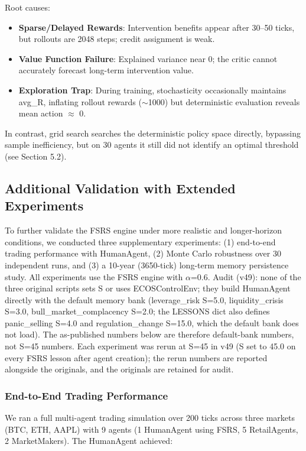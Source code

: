 \documentclass[11pt]{article}
\begin{document}
Root causes:

\begin{itemize}
\item \textbf{Sparse/Delayed Rewards}: Intervention benefits appear after 30--50 ticks, but rollouts are 2048 steps; credit assignment is weak.
\item \textbf{Value Function Failure}: Explained variance near 0; the critic cannot accurately forecast long-term intervention value.
\item \textbf{Exploration Trap}: During training, stochasticity occasionally maintains avg\_R, inflating rollout rewards ($\sim$1000) but deterministic evaluation reveals mean action $\approx$ 0.
\end{itemize}

In contrast, grid search searches the deterministic policy space directly, bypassing sample inefficiency, but on 30 agents it still did not identify an optimal threshold (see Section 5.2).

\subsection{Additional Validation with Extended Experiments}
To further validate the FSRS engine under more realistic and longer-horizon conditions, we conducted three supplementary experiments: (1) end-to-end trading performance with HumanAgent, (2) Monte Carlo robustness over 30 independent runs, and (3) a 10-year (3650-tick) long-term memory persistence study. All experiments use the FSRS engine with $\alpha$=0.6. Audit (v49): none of the three original scripts sets S or uses ECOSControlEnv; they build HumanAgent directly with the default memory bank (leverage\_risk S=5.0, liquidity\_crisis S=3.0, bull\_market\_complacency S=2.0; the LESSONS dict also defines panic\_selling S=4.0 and regulation\_change S=15.0, which the default bank does not load). The as-published numbers below are therefore default-bank numbers, not S=45 numbers. Each experiment was rerun at S=45 in v49 (S set to 45.0 on every FSRS lesson after agent creation); the rerun numbers are reported alongside the originals, and the originals are retained for audit.

\subsubsection{End-to-End Trading Performance}
We ran a full multi-agent trading simulation over 200 ticks across three markets (BTC, ETH, AAPL) with 9 agents (1 HumanAgent using FSRS, 5 RetailAgents, 2 MarketMakers). The HumanAgent achieved:
\end{document}
